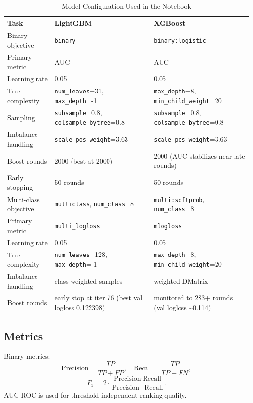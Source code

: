 \documentclass[10pt,journal]{IEEEtran}
\begin{document}
\begin{table}[!t]
\caption{Model Configuration Used in the Notebook}
\label{tab:hparams}
\centering
\begin{tabular}{l l l}
\toprule
Task & LightGBM & XGBoost \\
\midrule
Binary objective & \texttt{binary} & \texttt{binary:logistic} \\
Primary metric & AUC & AUC \\
Learning rate & 0.05 & 0.05 \\
Tree complexity & \texttt{num\_leaves}=31, \texttt{max\_depth}=-1 & \texttt{max\_depth}=8, \texttt{min\_child\_weight}=20 \\
Sampling & \texttt{subsample}=0.8, \texttt{colsample\_bytree}=0.8 & \texttt{subsample}=0.8, \texttt{colsample\_bytree}=0.8 \\
Imbalance handling & \texttt{scale\_pos\_weight}=3.63 & \texttt{scale\_pos\_weight}=3.63 \\
Boost rounds & 2000 (best at 2000) & 2000 (AUC stabilizes near late rounds) \\
Early stopping & 50 rounds & 50 rounds \\
\midrule
Multi-class objective & \texttt{multiclass}, \texttt{num\_class}=8 & \texttt{multi:softprob}, \texttt{num\_class}=8 \\
Primary metric & \texttt{multi\_logloss} & \texttt{mlogloss} \\
Learning rate & 0.05 & 0.05 \\
Tree complexity & \texttt{num\_leaves}=128, \texttt{max\_depth}=-1 & \texttt{max\_depth}=8, \texttt{min\_child\_weight}=20 \\
Imbalance handling & class-weighted samples & weighted DMatrix \\
Boost rounds & early stop at iter 76 (best val logloss 0.122398) & monitored to 283+ rounds (val logloss \textasciitilde0.114) \\
\bottomrule
\end{tabular}
\end{table}

\subsection{Metrics}
Binary metrics:
\begin{equation}
\text{Precision}=\frac{TP}{TP+FP},\quad
\text{Recall}=\frac{TP}{TP+FN},
\end{equation}
\begin{equation}
F_1 = 2\cdot\frac{\text{Precision}\cdot\text{Recall}}{\text{Precision}+\text{Recall}}.
\end{equation}
AUC-ROC is used for threshold-independent ranking quality.
\end{document}
